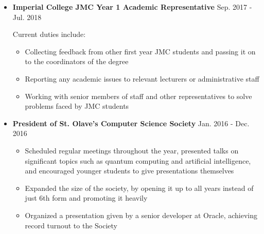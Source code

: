 \documentclass[11pt,a4paper,sans]{moderncv}        %
\begin{document}
\begin{itemize}

\item \textbf{Imperial College JMC Year 1 Academic Representative} \hfill Sep. 2017 - Jul. 2018

\vspace{3pt}

Current duties include:

\vspace{3pt}

\begin{itemize}

\item Collecting feedback from other first year JMC students and passing it on to the coordinators of the degree

\vspace{3pt}

\item Reporting any academic issues to relevant lecturers or administrative staff

\vspace{3pt}

\item Working with senior members of staff and other representatives to solve problems faced by JMC students

\end{itemize}

\vspace{6pt}

\item \textbf{President of St. Olave’s Computer Science Society} \hfill Jan. 2016 - Dec. 2016

\vspace{3pt}

\begin{itemize}

\item Scheduled regular meetings throughout the year, presented talks on significant topics such as quantum computing and artificial intelligence, and encouraged younger students to give presentations themselves

\vspace{3pt}

\item Expanded the size of the society, by opening it up to all years instead of just 6th form and promoting it heavily

\vspace{3pt}

\item Organized a presentation given by a senior developer at Oracle, achieving record turnout to the Society


\end{itemize}
\end{itemize}
\end{document}
